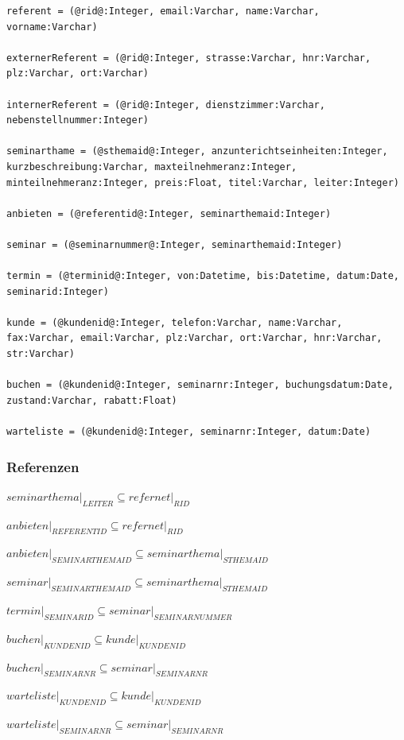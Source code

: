 \documentclass[10pt,a4paper]{article}
\begin{document}
\begin{lstlisting}[]
referent = (@rid@:Integer, email:Varchar, name:Varchar, vorname:Varchar)

externerReferent = (@rid@:Integer, strasse:Varchar, hnr:Varchar, plz:Varchar, ort:Varchar)

internerReferent = (@rid@:Integer, dienstzimmer:Varchar, nebenstellnummer:Integer)

seminarthame = (@sthemaid@:Integer, anzunterichtseinheiten:Integer, kurzbeschreibung:Varchar, maxteilnehmeranz:Integer, minteilnehmeranz:Integer, preis:Float, titel:Varchar, leiter:Integer)

anbieten = (@referentid@:Integer, seminarthemaid:Integer)

seminar = (@seminarnummer@:Integer, seminarthemaid:Integer)

termin = (@terminid@:Integer, von:Datetime, bis:Datetime, datum:Date, seminarid:Integer)

kunde = (@kundenid@:Integer, telefon:Varchar, name:Varchar, fax:Varchar, email:Varchar, plz:Varchar, ort:Varchar, hnr:Varchar, str:Varchar)

buchen = (@kundenid@:Integer, seminarnr:Integer, buchungsdatum:Date, zustand:Varchar, rabatt:Float)

warteliste = (@kundenid@:Integer, seminarnr:Integer, datum:Date)
\end{lstlisting}

\subsubsection{Referenzen}
$seminarthema\vert_{LEITER} \subseteq refernet\vert_{RID}$

$anbieten\vert_{REFERENTID} \subseteq refernet\vert_{RID}$

$anbieten\vert_{SEMINARTHEMAID} \subseteq seminarthema\vert_{STHEMAID}$

$seminar\vert_{SEMINARTHEMAID} \subseteq seminarthema\vert_{STHEMAID}$

$termin\vert_{SEMINARID} \subseteq seminar\vert_{SEMINARNUMMER}$

$buchen\vert_{KUNDENID} \subseteq kunde\vert_{KUNDENID}$

$buchen\vert_{SEMINARNR} \subseteq seminar\vert_{SEMINARNR}$

$warteliste\vert_{KUNDENID} \subseteq kunde\vert_{KUNDENID}$

$warteliste\vert_{SEMINARNR} \subseteq seminar\vert_{SEMINARNR}$
\end{document}

